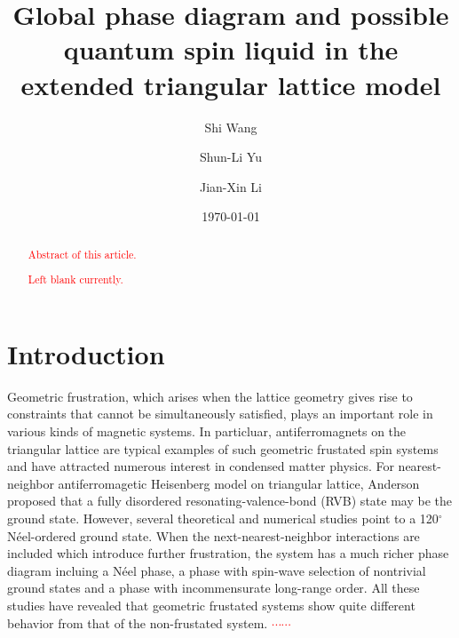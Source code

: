 \documentclass[aps,prb,reprint,groupedaddress,showpacs,amsfonts,amsmath,amssymb,superscriptaddress]{revtex4-1}
\begin{document}
\title{Global phase diagram and possible quantum spin liquid in the extended triangular lattice model}

\author{Shi Wang}
\author{Shun-Li Yu}
\author{Jian-Xin Li}

\date{\today}

\begin{abstract}
\textcolor{red}{Abstract of this article.}

\textcolor{red}{Left blank currently.}
\end{abstract}

\maketitle

\section{Introduction}
Geometric frustration, which arises when the lattice geometry gives rise to constraints that cannot be simultaneously satisfied, plays an important role in various kinds of magnetic systems. In particluar, antiferromagnets on the triangular lattice are typical examples of such geometric frustated spin systems and have attracted numerous interest in condensed matter physics. For nearest-neighbor antiferromagetic Heisenberg model on triangular lattice, Anderson proposed that a fully disordered resonating-valence-bond (RVB) state may be the ground state. However, several theoretical and numerical studies point to a 120$^\circ$ N\'{e}el-ordered ground state. When the next-nearest-neighbor interactions are included which introduce further frustration, the system has a much richer phase diagram incluing a N\'{e}el phase, a phase with spin-wave selection of nontrivial ground states and a phase with incommensurate long-range order. All these studies have revealed that geometric frustated systems show quite different behavior from that of the non-frustated system. \textcolor{red}{$\cdots\cdots$}
\end{document}
